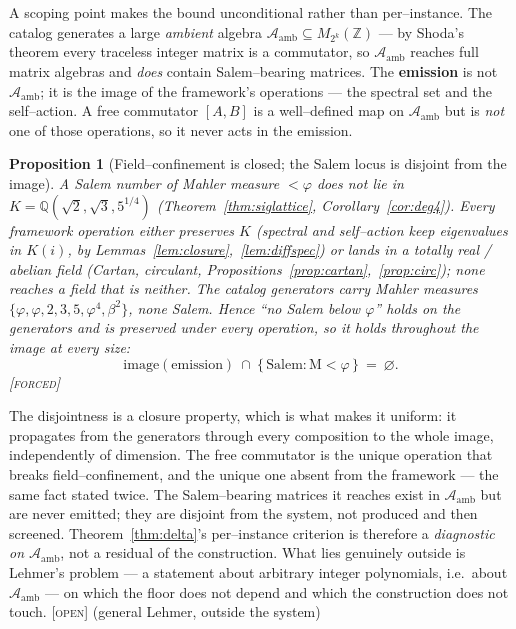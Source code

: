 \documentclass[11pt]{article}
\theoremstyle{plain}
\newtheorem{proposition}[theorem]{Proposition}
\theoremstyle{definition}
\theoremstyle{remark}
\newcommand{\forced}{\textcolor{forcedc}{\textsc{[forced]}}}
\newcommand{\openq}{\textcolor{openc}{\textsc{[open]}}}
\newcommand{\Q}{\mathbb{Q}}
\newcommand{\Z}{\mathbb{Z}}
\newcommand{\Mah}{\mathrm{M}}
\newcommand{\Acal}{\mathcal{A}}
\begin{document}
A scoping point makes the bound unconditional rather than per--instance. The catalog generates a large \emph{ambient} algebra $\Acal_{\mathrm{amb}}\subseteq M_{2^k}(\Z)$ --- by Shoda's theorem every traceless integer matrix is a commutator, so $\Acal_{\mathrm{amb}}$ reaches full matrix algebras and \emph{does} contain Salem--bearing matrices. The \textbf{emission} is not $\Acal_{\mathrm{amb}}$; it is the image of the framework's operations --- the spectral set and the self--action. A free commutator $[A,B]$ is a well--defined map on $\Acal_{\mathrm{amb}}$ but is \emph{not} one of those operations, so it never acts in the emission.

\begin{proposition}[Field--confinement is closed; the Salem locus is disjoint from the image]\label{prop:exclusion}
A Salem number of Mahler measure $<\varphi$ does not lie in $K=\Q(\sqrt2,\sqrt3,5^{1/4})$ (Theorem~\ref{thm:siglattice}, Corollary~\ref{cor:deg4}). Every framework operation either preserves $K$ (spectral and self--action keep eigenvalues in $K(i)$, by Lemmas~\ref{lem:closure},~\ref{lem:diffspec}) or lands in a totally real / abelian field (Cartan, circulant, Propositions~\ref{prop:cartan},~\ref{prop:circ}); none reaches a field that is neither. The catalog generators carry Mahler measures $\{\varphi,\varphi,2,3,5,\varphi^4,\beta^2\}$, none Salem. Hence ``no Salem below $\varphi$'' holds on the generators and is preserved under every operation, so it holds throughout the image at every size:
\[
\operatorname{image(emission)}\ \cap\ \{\,\text{Salem}:\Mah<\varphi\,\}\ =\ \varnothing .
\]
\forced
\end{proposition}

The disjointness is a closure property, which is what makes it uniform: it propagates from the generators through every composition to the whole image, independently of dimension. The free commutator is the unique operation that breaks field--confinement, and the unique one absent from the framework --- the same fact stated twice. The Salem--bearing matrices it reaches exist in $\Acal_{\mathrm{amb}}$ but are never emitted; they are disjoint from the system, not produced and then screened. Theorem~\ref{thm:delta}'s per--instance criterion is therefore a \emph{diagnostic on $\Acal_{\mathrm{amb}}$}, not a residual of the construction. What lies genuinely outside is Lehmer's problem --- a statement about arbitrary integer polynomials, i.e.\ about $\Acal_{\mathrm{amb}}$ --- on which the floor does not depend and which the construction does not touch. \openq{} (general Lehmer, outside the system)
\end{document}
